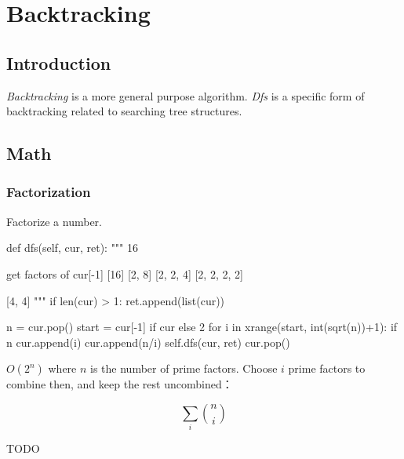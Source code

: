 \chapter{Backtracking}
\section{Introduction}
 \textit{Backtracking} is a more general purpose algorithm. \textit{Dfs} is a specific form of backtracking related to searching tree structures. 

\section{Math}
\subsection{Factorization}\label{factorization}
Factorize a number.\\
\begin{python}
def dfs(self, cur, ret):
    """
    16

    get factors of cur[-1]
    [16]
    [2, 8]
    [2, 2, 4]
    [2, 2, 2, 2]

    [4, 4]
    """
    if len(cur) > 1:
        ret.append(list(cur))

    n = cur.pop()
    start = cur[-1] if cur else 2
    for i in xrange(start, int(sqrt(n))+1):
        if n%
            cur.append(i)
            cur.append(n/i)
            self.dfs(cur, ret)
            cur.pop()
\end{python}
 $O(2^n)$ where $n$ is the number of prime factors. Choose $i$ prime factors to combine then, and keep the rest uncombined： 

$$\sum_i {n \choose i}$$

TODO

